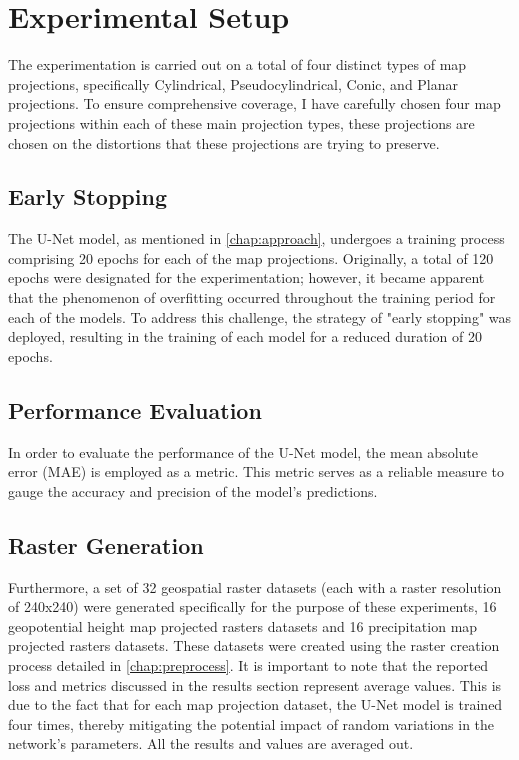 \section{Experimental Setup}
The experimentation is carried out on a total of four distinct types of map projections, specifically Cylindrical, Pseudocylindrical, Conic, and Planar projections.
To ensure comprehensive coverage, I have carefully chosen four map projections within each of these main projection types, these projections are chosen on the distortions that these projections are trying to preserve.

\subsection{Early Stopping}
The U-Net model, as mentioned in \autoref{chap:approach}, undergoes a training process comprising 20 epochs for each of the map projections.
Originally, a total of 120 epochs were designated for the experimentation; however, it became apparent that the phenomenon of overfitting occurred throughout the
training period for each of the models. To address this challenge, the strategy of "early stopping" was deployed, resulting in the training of each model for a reduced
duration of 20 epochs.

\subsection{Performance Evaluation}
In order to evaluate the performance of the U-Net model, the mean absolute error (MAE) is employed as a metric. This metric serves as a reliable measure to gauge
the accuracy and precision of the model's predictions.
\subsection{Raster Generation}
Furthermore, a set of 32 geospatial raster datasets (each with a raster resolution of 240x240) were generated specifically for the purpose of these experiments, 16 geopotential height map projected rasters datasets and 16 precipitation map projected rasters datasets.
These datasets were created using the raster creation process detailed in \autoref{chap:preprocess}.
It is important to note that the reported loss and metrics discussed
in the results section represent average values. This is due to the fact that for each map projection dataset, the U-Net model is trained four times, thereby mitigating
the potential impact of random variations in the network's parameters. All the results and values are averaged out.
